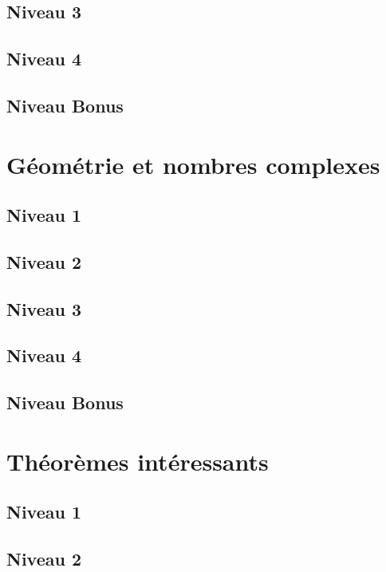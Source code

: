\documentclass[a4paper]{report}
\begin{document}
			\subsection{Niveau 3}
			
			\subsection{Niveau 4}
			
			\subsection{Niveau Bonus}
		
		\section{Géométrie et nombres complexes}
		
			\subsection{Niveau 1}
		
			\subsection{Niveau 2}
		
			\subsection{Niveau 3}
			
			\subsection{Niveau 4}
			
			\subsection{Niveau Bonus}
		
		\section{Théorèmes intéressants}
		
			\subsection{Niveau 1}
		
			\subsection{Niveau 2}
		
\end{document}
